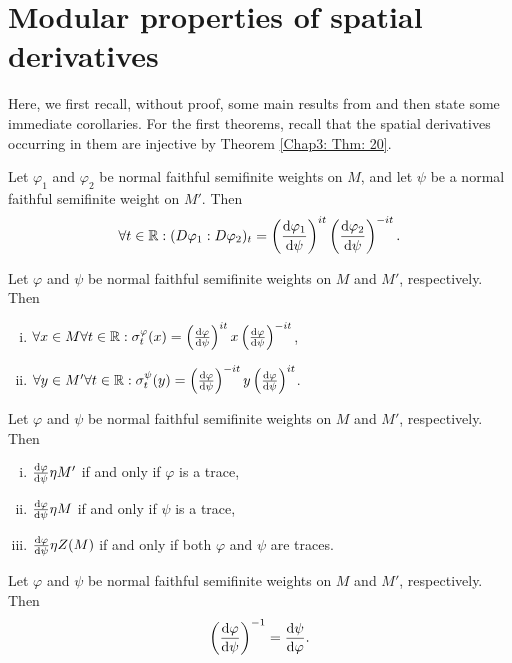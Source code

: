 \section{Modular properties of spatial derivatives}
Here, we first recall, without proof, some main results from \cite{1} and then state some immediate corollaries. For the first theorems, recall that the spatial derivatives occurring in them are injective by Theorem \ref{Chap3: Thm: 20}.
\begin{theorem}\label{Chap3: Thm: 25}
    Let $\varphi_1$ and $\varphi_2$ be normal faithful semifinite weights on $M$, and let $\psi$ be a normal faithful semifinite weight on $M'$. Then
    \[
        \forall t\in \mathbb{R}:(D\varphi_1:D\varphi_2)_t=\left( \dv{\varphi_1}{\psi}\right)^{it}\left( \dv{\varphi_2}{\psi}\right)^{-it}.
    \]
\end{theorem}
\begin{theorem}\label{Chap3: Thm: 26}
    Let $\varphi$ and $\psi$ be normal faithful semifinite weights on $M$ and $M'$, respectively. Then
    \begin{enumerate}[(i)]
        \item $\forall x\in M\forall t\in \mathbb{R}:\sigma_t^\varphi(x)=\left( \dv{\varphi}{\psi}\right)^{it}x\left( \dv{\varphi}{\psi}\right)^{-it}$,
        \item $\forall y\in M'\forall t\in \mathbb{R}:\sigma_t^\psi(y)=\left( \dv{\varphi}{\psi}\right)^{-it}y\left( \dv{\varphi}{\psi}\right)^{it}$.
    \end{enumerate}
\end{theorem}
\begin{corollary}\label{Chap3: Coro: 27}
    Let $\varphi$ and $\psi$ be normal faithful semifinite weights on $M$ and $M'$, respectively. Then
    \begin{enumerate}[(i)]
        \item $\dv{\varphi}{\psi}\eta M'$ if and only if $\varphi$ is a trace,
        \item $\dv{\varphi}{\psi}\eta M$ if and only if $\psi$ is a trace,
        \item $\dv{\varphi}{\psi}\eta Z(M)$ if and only if both $\varphi$ and $\psi$ are traces.
    \end{enumerate}
\end{corollary}
\begin{theorem}
    Let $\varphi$ and $\psi$ be normal faithful semifinite weights on $M$ and $M'$, respectively. Then
    \[
        \left( \dv{\varphi}{\psi} \right)^{-1}=\dv{\psi}{\varphi}.
    \]
\end{theorem}
